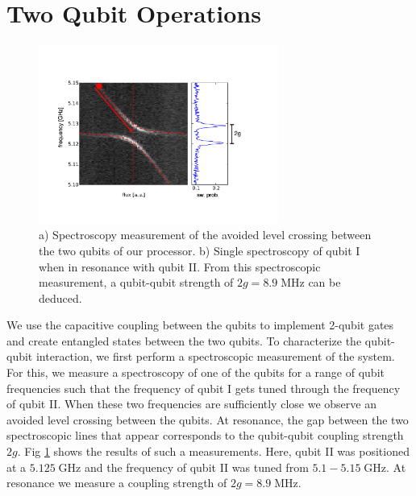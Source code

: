 \section{Two Qubit Operations}

\begin{figure}[ht!]
	\centering
		\includegraphics[width=0.7\textwidth]{"./data/ct5/2011_04_11 - anticrossing/qubit_anticrossing_modified"}
	\caption[Spectroscopic measurement of the avoided level crossing between the two qubits of our processor]{a) Spectroscopy measurement of the avoided level crossing between the two qubits of our processor. b) Single spectroscopy of qubit I when in resonance with qubit II. From this spectroscopic measurement, a qubit-qubit strength of $2g=8.9\;\mathrm{MHz}$ can be deduced. }
	\label{fig:qubit_anticrossing}
\end{figure}

We use the capacitive coupling between the qubits to implement 2-qubit gates and create entangled states between the two qubits. To characterize the qubit-qubit interaction, we first perform a spectroscopic measurement of the system. For this, we measure a spectroscopy of one of the qubits for a range of qubit frequencies such that the frequency of qubit I gets tuned through the frequency of qubit II. When these two frequencies are sufficiently close we observe an avoided level crossing between the qubits. At resonance, the gap between the two spectroscopic lines that appear corresponds to the qubit-qubit coupling strength $2g$. Fig \ref{fig:qubit_anticrossing} shows the results of such a measurements. Here, qubit II was positioned at a $5.125\;\mathrm{GHz}$ and the frequency of qubit II was tuned from $5.1-5.15\;\mathrm{GHz}$. At resonance we measure a coupling strength of $2g = 8.9\;\mathrm{MHz}$.

\smallskip


